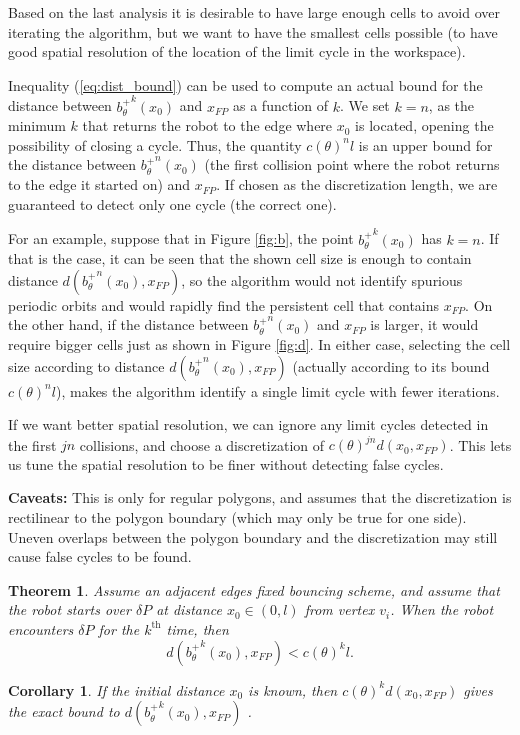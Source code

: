 \documentclass[12pt,a4paper]{article}
\newtheorem{theorem}{\bf Theorem}
\newtheorem{corollary}{\bf Corollary}
\begin{document}
Based on the last analysis it is desirable to have large enough cells to avoid
over iterating the algorithm, but we want to have the smallest cells possible
(to have good spatial resolution of the location of the limit cycle in the
workspace).

Inequality (\ref{eq:dist_bound}) can be used to compute an actual bound for the
distance between ${b^+_{\theta}}^{k}(x_0)$ and $x_{FP}$ as a function of $k$.
We set $k=n$, as the minimum $k$ that returns the robot to the
edge where $x_0$ is located, opening the possibility of closing a cycle. Thus,
the quantity $c(\theta)^n l$ is an upper bound for the distance between
${b^+_{\theta}}^n(x_0)$ (the first collision point where the robot returns to the
 edge it started on) and $x_{FP}$. If chosen as the discretization length, we
are guaranteed to detect only one cycle (the correct one).

For an example, suppose that in Figure \ref{fig:b}, the point
${b^+_{\theta}}^{k}(x_0)$ has $k=n$. If that is the case, it can be seen that
the shown cell size is enough to contain distance
$d({b^+_{\theta}}^{n}(x_0),x_{FP})$, so the algorithm would not identify
spurious periodic orbits and would rapidly find the persistent cell that
contains $x_{FP}$. On the other hand, if the distance between
${b^+_{\theta}}^{n}(x_0)$ and $x_{FP}$ is larger, it would require bigger cells
just as shown in Figure \ref{fig:d}. In either case, selecting the cell size
according to distance $d({b^+_{\theta}}^{n}(x_0),x_{FP})$ (actually according to
its bound $c(\theta)^{n} l$), makes the algorithm identify a single limit cycle
with fewer iterations.

If we want better spatial resolution, we can ignore any limit cycles detected
in the first $jn$ collisions, and choose a discretization of $c(\theta)^{jn}
d(x_0, x_{FP})$. This lets us tune the spatial resolution to be finer without
detecting false cycles.

\textbf{Caveats:} This is only for regular polygons, and assumes that the
discretization is rectilinear to the polygon boundary (which may only be true
for one side). Uneven overlaps between the polygon boundary and the
discretization may still cause false cycles to be found.

\begin{theorem} \label{Proposition:distanceFromFP}
Assume an adjacent edges fixed bouncing scheme, and assume that the robot starts
over $\delta P$ at distance $x_0 \in (0,l)$ from vertex $v_i$. When the robot
encounters $\delta P$ for the $k^{\text{th}}$ time, then \begin{equation}
\label{eq:dist_bound}
d({b^+_{\theta}}^{k}(x_0),x_{FP}) < c(\theta)^{k} l.
\end{equation}
\end{theorem}
\begin{corollary} \label{rm1}
If the initial distance $x_0$ is known, then $c(\theta)^{k} d(x_0,x_{FP})$ gives
the exact bound to $d({b^+_{\theta}}^{k}(x_0),x_{FP})$ . 
\end{corollary}
\end{document}
